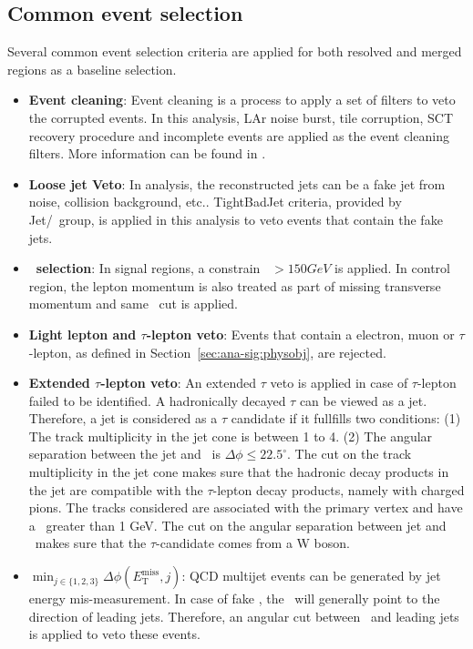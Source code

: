 \subsection{Common event selection}
\par Several common event selection criteria are applied for both resolved and merged regions as a baseline selection.
\begin{itemize}
    \item \textbf{Event cleaning}: Event cleaning is a process to apply a set of filters to veto the corrupted events. In this analysis, LAr noise burst, tile corruption, SCT recovery procedure and incomplete events are applied as the event cleaning filters. More information can be found in \cite{c8-evt-cleaning}.
    \item \textbf{Loose jet Veto}: In analysis, the reconstructed jets can be a fake jet from noise, collision background, etc.. TightBadJet criteria, provided by Jet/\met~group, is applied in this analysis to veto events that contain the fake jets.
    \item \textbf{\met~selection}: In signal regions, a constrain \met~$>150GeV$ is applied. In control region, the lepton momentum is also treated as part of missing transverse momentum and same \met~cut is applied.
    \item \textbf{Light lepton and $\tau$-lepton veto}: Events that contain a electron, muon or $\tau$-lepton, as defined in Section~\ref{sec:ana-sig:physobj}, are rejected.
    \item \textbf{Extended $\tau$-lepton veto}: An extended $\tau$ veto is applied in case of $\tau$-lepton failed to be identified. A hadronically decayed $\tau$ can be viewed as a jet. Therefore, a jet is considered as a $\tau$ candidate if it fullfills two conditions: (1) The track multiplicity in the jet cone is between 1 to 4. (2) The angular separation between the jet and \met~is $\Delta \phi \leq 22.5^\circ$. The cut on the track multiplicity in the jet cone makes sure that the hadronic decay products in the jet are compatible with the $\tau$-lepton decay products, namely with charged pions. The tracks considered are associated with the primary vertex and have a \pt~greater than 1 GeV. The cut on the angular separation between jet and \met~makes sure that the $\tau$-candidate comes from a W boson.
    \item \textbf{$\min_{j \in \{1,2,3\}}\Delta\phi(E_{\mathrm{T}}^{\mathrm{miss}},j)$}: QCD multijet events can be generated by jet energy mis-measurement. In case of fake \met, the \met~will generally point to the direction of leading jets. Therefore, an angular cut between \met~and leading jets is applied to veto these events.
\end{itemize}

